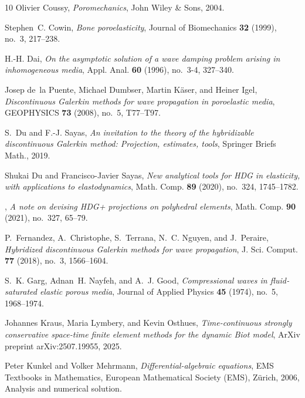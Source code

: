 \documentclass[10pt,letterpaper]{amsart}
\theoremstyle{plain} %
\theoremstyle{remark} %
\begin{document}
\begin{thebibliography}{10}
Olivier Coussy, \emph{Poromechanics}, John Wiley \& Sons, 2004.

Stephen~C. Cowin, \emph{Bone poroelasticity}, Journal of Biomechanics
  \textbf{32} (1999), no.~3, 217--238.

H.-H. Dai, \emph{On the asymptotic solution of a wave damping problem arising
  in inhomogeneous media}, Appl. Anal. \textbf{60} (1996), no.~3-4, 327--340.

Josep de~la Puente, Michael Dumbser, Martin Käser, and Heiner Igel,
  \emph{Discontinuous {G}alerkin methods for wave propagation in poroelastic
  media}, GEOPHYSICS \textbf{73} (2008), no.~5, T77--T97.

S.~Du and F.-J. Sayas, \emph{An invitation to the theory of the hybridizable
  discontinuous {G}alerkin method: Projection, estimates, tools}, Springer
  Briefs Math., 2019.

Shukai Du and Francisco-Javier Sayas, \emph{New analytical tools for {HDG} in
  elasticity, with applications to elastodynamics}, Math. Comp. \textbf{89}
  (2020), no.~324, 1745--1782. 

\bysame, \emph{A note on devising {HDG}+ projections on polyhedral elements},
  Math. Comp. \textbf{90} (2021), no.~327, 65--79. 

P.~Fernandez, A.~Christophe, S.~Terrana, N.~C. Nguyen, and J.~Peraire,
  \emph{Hybridized discontinuous {G}alerkin methods for wave propagation}, J.
  Sci. Comput. \textbf{77} (2018), no.~3, 1566--1604. 

S.~K. Garg, Adnan~H. Nayfeh, and A.~J. Good, \emph{Compressional waves in
  fluid‐saturated elastic porous media}, Journal of Applied Physics
  \textbf{45} (1974), no.~5, 1968--1974.

Johannes Kraus, Maria Lymbery, and Kevin Osthues, \emph{Time-continuous
  strongly conservative space-time finite element methods for the dynamic
  {B}iot model}, ArXiv preprint arXiv:2507.19955, 2025.

Peter Kunkel and Volker Mehrmann, \emph{Differential-algebraic equations}, EMS
  Textbooks in Mathematics, European Mathematical Society (EMS), Z\"urich,
  2006, Analysis and numerical solution. 


\end{thebibliography}
\end{document}
